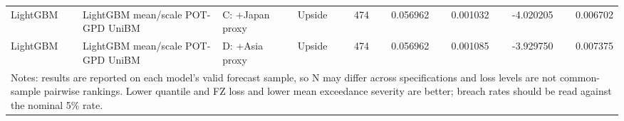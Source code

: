 \begin{tabular}{lll lrrrrr}
LightGBM & LightGBM mean/scale POT-GPD UniBM & C: +Japan proxy & Upside & 474 & 0.056962 & 0.001032 & -4.020205 & 0.006702 \\
LightGBM & LightGBM mean/scale POT-GPD UniBM & D: +Asia proxy & Upside & 474 & 0.056962 & 0.001085 & -3.929750 & 0.007375 \\
\midrule
\multicolumn{9}{p{0.96\linewidth}}{\footnotesize Notes: results are reported on each model's valid forecast sample, so N may differ across specifications and loss levels are not common-sample pairwise rankings. Lower quantile and FZ loss and lower mean exceedance severity are better; breach rates should be read against the nominal 5\% rate.} \\
\bottomrule
\end{tabular}
